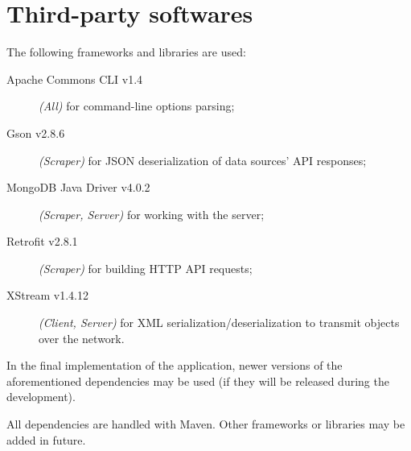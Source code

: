 \section{Third-party softwares}\label{sec:dependencies}

The following frameworks and libraries are used:
\begin{description}
	\item[Apache Commons CLI v1.4] \textit{(All)} for command-line options
		parsing;
	\item[Gson v2.8.6] \textit{(Scraper)} for JSON deserialization of data
		sources' API responses;
	\item[MongoDB Java Driver v4.0.2] \textit{(Scraper, Server)} for
		working with the \mongodb{} server;
	\item[Retrofit v2.8.1] \textit{(Scraper)} for building HTTP API
		requests;
	\item[XStream v1.4.12] \textit{(Client, Server)} for XML
		serialization/deserialization to transmit objects over the
		network.
\end{description}

In the final implementation of the application, newer versions of the
aforementioned dependencies may be used (if they will be released during the
development).

All dependencies are handled with Maven. Other frameworks or libraries may be
added in future.
